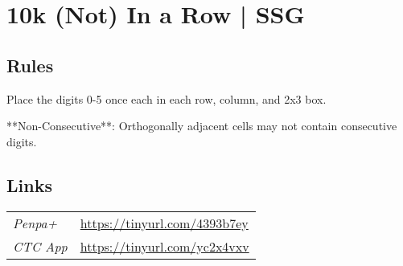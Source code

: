 \section{10k (Not) In a Row | {\normalfont SSG}}
\label{sec:35-10k-not-in-a-row-ssg}

\subsection*{Rules}
\begin{markdown}
Place the digits 0-5 once each in each row, column, and 2x3 box.



**Non-Consecutive**: Orthogonally adjacent cells may not contain consecutive digits.
\end{markdown}
\subsection*{Links}
\begin{tabularx}{\textwidth}{l X}
\emph{Penpa+} & \url{https://tinyurl.com/4393b7ey} \\
\emph{CTC App} & \url{https://tinyurl.com/yc2x4vxv} \\
\end{tabularx}
\pagebreak
